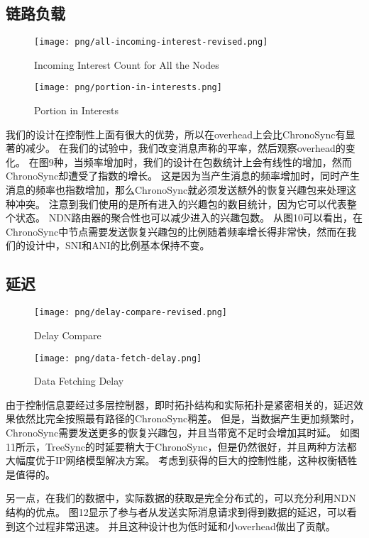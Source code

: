 \subsection{链路负载}

\begin{figure}
\centering
\texttt{[image: png/all-incoming-interest-revised.png]}
\caption{Incoming Interest Count for All the Nodes}
\label{overhead}
\end{figure}
\begin{figure}
\centering
\texttt{[image: png/portion-in-interests.png]}
\caption{Portion in Interests}
\label{recovery_percentage}
\end{figure}

我们的设计在控制性上面有很大的优势，所以在overhead上会比ChronoSync有显著的减少。
在我们的试验中，我们改变消息声称的平率，然后观察overhead的变化。
在图9种，当频率增加时，我们的设计在包数统计上会有线性的增加，然而ChronoSync却遭受了指数的增长。
这是因为当产生消息的频率增加时，同时产生消息的频率也指数增加，那么ChronoSync就必须发送额外的恢复兴趣包来处理这种冲突。
注意到我们使用的是所有进入的兴趣包的数目统计，因为它可以代表整个状态。
NDN路由器的聚合性也可以减少进入的兴趣包数。
从图10可以看出，在ChronoSync中节点需要发送恢复兴趣包的比例随着频率增长得非常快，然而在我们的设计中，SNI和ANI的比例基本保持不变。

\subsection{延迟}

\begin{figure}
\centering
\texttt{[image: png/delay-compare-revised.png]}
\caption{Delay Compare}
\label{delay_compare}
\end{figure}

\begin{figure}
\centering
\texttt{[image: png/data-fetch-delay.png]}
\caption{Data Fetching Delay}
\label{data_fetch_delay}
\end{figure}

由于控制信息要经过多层控制器，即时拓扑结构和实际拓扑是紧密相关的，延迟效果依然比完全按照最有路径的ChronoSync稍差。
但是，当数据产生更加频繁时，ChronoSync需要发送更多的恢复兴趣包，并且当带宽不足时会增加其时延。
如图11所示，TreeSync的时延要稍大于ChronoSync，但是仍然很好，并且两种方法都大幅度优于IP网络模型解决方案。
考虑到获得的巨大的控制性能，这种权衡牺牲是值得的。

另一点，在我们的数据中，实际数据的获取是完全分布式的，可以充分利用NDN结构的优点。
图12显示了参与者从发送实际消息请求到得到数据的延迟，可以看到这个过程非常迅速。
并且这种设计也为低时延和小overhead做出了贡献。

